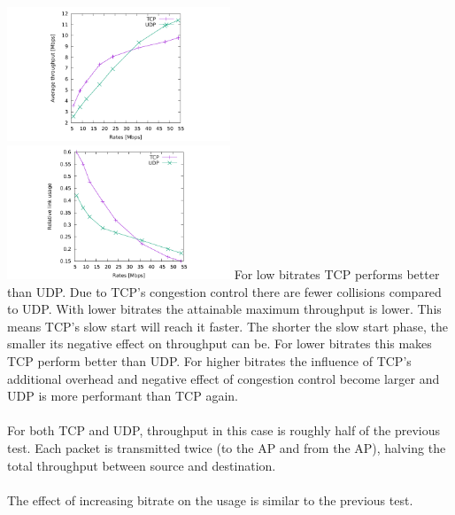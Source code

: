 \includegraphics[width=0.5\textwidth]{traces/L3-2-1-tput.pdf}
\includegraphics[width=0.5\textwidth]{traces/L3-2-1-usage.pdf}
For low bitrates TCP performs better than UDP. Due to TCP's congestion control there are fewer collisions compared to UDP. With lower bitrates the attainable maximum throughput is lower. This means TCP's slow start will reach it faster. The shorter the slow start phase, the smaller its negative effect on throughput can be. For lower bitrates this makes TCP perform better than UDP. For higher bitrates the influence of TCP's additional overhead and negative effect of congestion control become larger and UDP is more performant than TCP again. \\ \\
For both TCP and UDP, throughput in this case is roughly half of the previous test. Each packet is transmitted twice (to the AP and from the AP), halving the total throughput between source and destination. \\ \\
 The effect of increasing bitrate on the usage is similar to the previous test.
